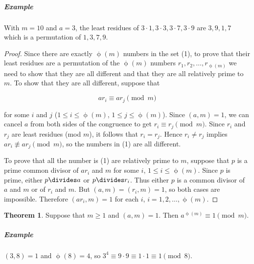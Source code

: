 \documentclass{article}
\theoremstyle{definition} %
\newtheorem{theorem}{Theorem}[section] %
\theoremstyle{definition}
\theoremstyle{definition}
\newcommand{\tot}{\upphi}
\theoremstyle{definition}
\begin{document}
  \subparagraph{Example} With $m = 10$ and $a = 3$, the least residues of $3 \cdot 1,
  3 \cdot 3, 3 \cdot 7, 3 \cdot 9$ are $3, 9, 1, 7$ which is a permutation of $1, 3, 7, 9$.
  
  \begin{proof}
    Since there are exactly $\tot(m)$ numbers in the set (1), to prove that their least
    residues are a permutation of the $\tot(m)$ numbers $r_1, r_2, \dots, r_{\tot(m)}$
    we need to show that they are all different and that they are all relatively prime to $m$.
    To show that they are all different, suppose that
    
    \begin{equation*}
      ar_i \equiv ar_j \pmod{m}
    \end{equation*}
    
    for some $i$ and $j$ ($1 \leq i \leq \tot(m)$, $1 \leq j \leq \tot(m)$). Since $(a, m) = 1$,
    we can cancel $a$ from both sides of the congruence to get $r_i \equiv r_j \pmod{m}$.
    Since $r_i$ and $r_j$ are least residues (mod $m$), it follows that $r_i = r_j$. Hence
    $r_i \neq r_j$ implies $ar_i \nequiv ar_j \pmod{m}$, so the numbers in (1) are all different.
    
    To prove that all the number is (1) are relatively prime to $m$, suppose that $p$ is a prime
    common divisor of $ar_i$ and $m$ for some $i$, $1 \leq i \leq \tot(m)$. Since $p$ is prime,
    either $p \divides a$ or $p \divides r_i$. Thus either $p$ is a common divisor of $a$ and $m$
    or of $r_i$ and $m$. But $(a, m) = (r_i, m) = 1$, so both cases are impossible. Therefore
    $(ar_i, m) = 1$ for each $i$, $i = 1, 2, \dots, \tot(m)$.
  \end{proof}
  
  \begin{theorem}
    Suppose that $m \geq 1$ and $(a, m) = 1$. Then $a^{\tot(m)} \equiv 1 \pmod{m}$.
  \end{theorem}
  
  \subparagraph{Example} $(3, 8) = 1$ and $\tot(8) = 4$, so $3^4 \equiv 9 \cdot 9 \equiv 1 \cdot 1 \equiv 1 \pmod{8}$.
  
\end{document}
